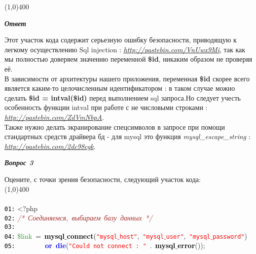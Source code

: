 \documentclass[a4paper,12pt]{article}
\begin{document}
\line(1,0){400}
\newpage 
\begin{center}
\textit{\textbf{Ответ}}
\end{center}
Этот участок кода содержит серьезную ошибку безопасности, приводящую к легкому осуществлению Sql injection : \href{http://pastebin.com/VnUwx9Mi}{\textit{http://pastebin.com/VnUwx9Mi}}, 
так как мы полностью доверяем значению переменной \textbf{\$id}, никаким образом не проверяя её.\\
В зависимости от архитектуры нашего приложения, переменная \textbf{\$id} скорее всего является каким-то целочисленным идентификатором : в таком случае можно сделать \textbf{\$id = intval(\$id)} перед выполнением sql запроса.Но следует учесть особенность функции intval при работе с не числовыми строками : \href{http://pastebin.com/ZdVmNbpA}{\textit{http://pastebin.com/ZdVmNbpA}}.\\
Также нужно делать экранирование спецсимволов в запросе при помощи стандартных средств драйвера бд - для mysql это функция \textit{mysql\_escape\_string} : \href{http://pastebin.com/2dc98cgk}{\textit{http://pastebin.com/2dc98cgk}}.
\medskip
\begin{center}
\textbf{\textit{Вопрос 3}}
\end{center}
Оцените, с точки зрения безопасности, следующий участок кода:\\
\line(1,0){400}
\\
\\
\noindent
\mbox{}\texttt{\textcolor{Black}{01:}} \textcolor{BrickRed}{\textless{}?php} \\
\mbox{}\texttt{\textcolor{Black}{02:}} \textit{\textcolor{Brown}{/*\ Соединяемся,\ выбираем\ базу\ данных\ */}} \\
\mbox{}\texttt{\textcolor{Black}{03:}}  \\
\mbox{}\texttt{\textcolor{Black}{04:}} \textcolor{ForestGreen}{\$link}\ \textcolor{BrickRed}{=}\ \textbf{\textcolor{Black}{mysql$\_$connect}}\textcolor{BrickRed}{(}\texttt{\textcolor{Red}{"{}mysql$\_$host"{}}}\textcolor{BrickRed}{,}\ \texttt{\textcolor{Red}{"{}mysql$\_$user"{}}}\textcolor{BrickRed}{,}\ \texttt{\textcolor{Red}{"{}mysql$\_$password"{}}}\textcolor{BrickRed}{)} \\
\mbox{}\texttt{\textcolor{Black}{05:}} \ \ \ \ \ \ \ \ \textbf{\textcolor{Blue}{or}}\ \textbf{\textcolor{Blue}{die}}\textcolor{BrickRed}{(}\texttt{\textcolor{Red}{"{}Could\ not\ connect\ :\ "{}}}\ \textcolor{BrickRed}{.}\ \textbf{\textcolor{Black}{mysql$\_$error}}\textcolor{BrickRed}{());} \\
\end{document}
